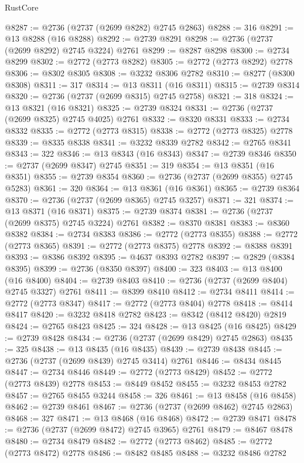 \begin{lexlean}{RustCore}
\begin{coremodule}
@8287 := @2736 (@2737 (@2699 @8282) @2745 @2863)
@8288 := 316
@8291 := @13 @8288 (@16 @8288)
@8292 := @2739 @8291
@8298 := @2736 (@2737 (@2699 @8292) @2745 @3224) @2761
@8299 := @8287 @8298
@8300 := @2734 @8299
@8302 := @2772 (@2773 @8282)
@8305 := @2772 (@2773 @8292) @2778
@8306 := @8302 @8305
@8308 := @3232 @8306 @2782
@8310 := @8277 (@8300 @8308)
@8311 := 317
@8314 := @13 @8311 (@16 @8311)
@8315 := @2739 @8314
@8320 := @2736 (@2737 (@2699 @8315) @2745 @2758)
@8321 := 318
@8324 := @13 @8321 (@16 @8321)
@8325 := @2739 @8324
@8331 := @2736 (@2737 (@2699 @8325) @2745 @4025) @2761
@8332 := @8320 @8331
@8333 := @2734 @8332
@8335 := @2772 (@2773 @8315)
@8338 := @2772 (@2773 @8325) @2778
@8339 := @8335 @8338
@8341 := @3232 @8339 @2782
@8342 := @2765 @8341
@8343 := 322
@8346 := @13 @8343 (@16 @8343)
@8347 := @2739 @8346
@8350 := @2737 (@2699 @8347) @2745
@8351 := 319
@8354 := @13 @8351 (@16 @8351)
@8355 := @2739 @8354
@8360 := @2736 (@2737 (@2699 @8355) @2745 @5283)
@8361 := 320
@8364 := @13 @8361 (@16 @8361)
@8365 := @2739 @8364
@8370 := @2736 (@2737 (@2699 @8365) @2745 @3257)
@8371 := 321
@8374 := @13 @8371 (@16 @8371)
@8375 := @2739 @8374
@8381 := @2736 (@2737 (@2699 @8375) @2745 @3224) @2761
@8382 := @8370 @8381
@8383 := @8360 @8382
@8384 := @2734 @8383
@8386 := @2772 (@2773 @8355)
@8388 := @2772 (@2773 @8365)
@8391 := @2772 (@2773 @8375) @2778
@8392 := @8388 @8391
@8393 := @8386 @8392
@8395 := @4637 @8393 @2782
@8397 := @2829 (@8384 @8395)
@8399 := @2736 (@8350 @8397)
@8400 := 323
@8403 := @13 @8400 (@16 @8400)
@8404 := @2739 @8403
@8410 := @2736 (@2737 (@2699 @8404) @2745 @3327) @2761
@8411 := @8399 @8410
@8412 := @2734 @8411
@8414 := @2772 (@2773 @8347)
@8417 := @2772 (@2773 @8404) @2778
@8418 := @8414 @8417
@8420 := @3232 @8418 @2782
@8423 := @8342 (@8412 @8420) @2819
@8424 := @2765 @8423
@8425 := 324
@8428 := @13 @8425 (@16 @8425)
@8429 := @2739 @8428
@8434 := @2736 (@2737 (@2699 @8429) @2745 @2863)
@8435 := 325
@8438 := @13 @8435 (@16 @8435)
@8439 := @2739 @8438
@8445 := @2736 (@2737 (@2699 @8439) @2745 @3414) @2761
@8446 := @8434 @8445
@8447 := @2734 @8446
@8449 := @2772 (@2773 @8429)
@8452 := @2772 (@2773 @8439) @2778
@8453 := @8449 @8452
@8455 := @3232 @8453 @2782
@8457 := @2765 @8455 @3244
@8458 := 326
@8461 := @13 @8458 (@16 @8458)
@8462 := @2739 @8461
@8467 := @2736 (@2737 (@2699 @8462) @2745 @2863)
@8468 := 327
@8471 := @13 @8468 (@16 @8468)
@8472 := @2739 @8471
@8478 := @2736 (@2737 (@2699 @8472) @2745 @3965) @2761
@8479 := @8467 @8478
@8480 := @2734 @8479
@8482 := @2772 (@2773 @8462)
@8485 := @2772 (@2773 @8472) @2778
@8486 := @8482 @8485
@8488 := @3232 @8486 @2782

\end{coremodule}
\end{lexlean}
